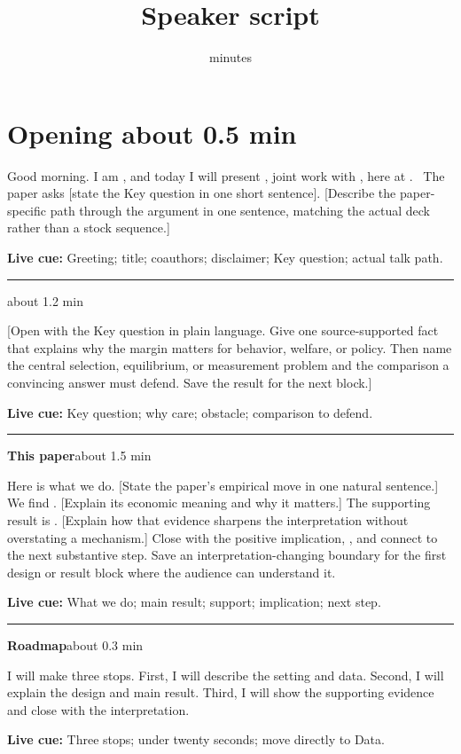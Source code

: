 \documentclass[11pt]{article}
\title{Speaker script\\[0.25em]\large \PaperTitle}
\author{\PaperAuthors}
\date{\VenueDate\quad [slot] minutes}
\newcommand{\Cue}[1]{\par\nobreak\smallskip\noindent\textcolor{ScriptGray}{\footnotesize
  \textbf{Live cue:} #1}\par}
\newcommand{\scriptopening}[2]{%
  \Needspace{10\baselineskip}%
  \section*{Opening \hfill\normalfont\small\textcolor{ScriptGray}{#1}}
  #2\par}
\newcommand{\scriptframe}[3]{%
  \Needspace{9\baselineskip}%
  \par\medskip\noindent\textcolor{ScriptBlue}{\rule{\linewidth}{0.55pt}}%
  \par\smallskip\noindent
  \textbf{#1}\hfill\textcolor{ScriptGray}{\small #2}\par\smallskip
  #3\par}
\begin{document}
\maketitle
\thispagestyle{fancy}

\scriptopening{about 0.5 min}{%
  Good morning. I am \PresenterName, and today I will present
  \emph{\PaperTitle}, joint work with \CoauthorsSpoken, here at \VenueShort.
  \TitleDisclaimer\ The paper asks [state the Key question in one short
  sentence]. [Describe the paper-specific path through the argument in one
  sentence, matching the actual deck rather than a stock sequence.]
  \Cue{Greeting; title; coauthors; disclaimer; Key question; actual talk path.}
}

\scriptframe{\KeyQuestion}{about 1.2 min}{%
  [Open with the Key question in plain language. Give one source-supported fact
  that explains why the margin matters for behavior, welfare, or policy. Then
  name the central selection, equilibrium, or measurement problem and the
  comparison a convincing answer must defend. Save the result for the next
  block.]
  \Cue{Key question; why care; obstacle; comparison to defend.}
}

\scriptframe{This paper}{about 1.5 min}{%
  Here is what we do. [State the paper's empirical move in one natural
  sentence.] We find \ResultHeadlineSpoken. [Explain its economic meaning and
  why it matters.] The supporting result is \ResultSupportSpoken. [Explain how
  that evidence sharpens the interpretation without overstating a mechanism.]
  Close with the positive implication, \ResultImplicationSpoken, and connect to
  the next substantive step. Save an interpretation-changing boundary for the
  first design or result block where the audience can understand it.
  \Cue{What we do; main result; support; implication; next step.}
}

\scriptframe{Roadmap}{about 0.3 min}{%
  I will make three stops. First, I will describe the setting and data. Second,
  I will explain the design and main result. Third, I will show the
  supporting evidence and close with the interpretation.
  \Cue{Three stops; under twenty seconds; move directly to Data.}
}
\end{document}
